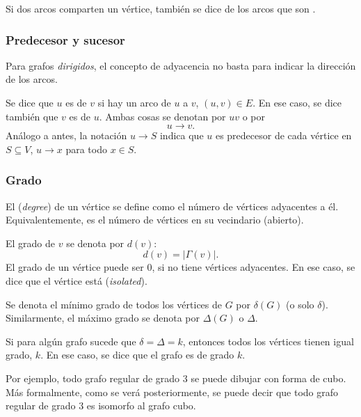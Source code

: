 Si dos arcos comparten un vértice, también se dice de los arcos que son .

\subsubsection{Predecesor y sucesor}
\label{sec:predecesor_sucesor}

Para grafos \emph{dirigidos}, el concepto de adyacencia no basta para indicar la dirección de los arcos.

Se dice que \(u\) es  de \(v\) si hay un arco de \(u\) a \(v\), \((u, v) \in E\). En ese caso, se dice también que \(v\) es  de \(u\). Ambas cosas se denotan por \(uv\) o por \[u \longrightarrow v.\]Análogo a antes, la notación \(u\longrightarrow S\) indica que \(u\) es predecesor de cada vértice en \(S\subseteq V\), \(u\longrightarrow x\) para todo \(x \in S\).

\subsubsection{Grado}
\label{sec:grado}

El  (\textit{degree}) de un vértice se define como el número de vértices adyacentes a él. Equivalentemente, es el número de vértices en su vecindario (abierto).

El grado de \(v\) se denota por \(d(v)\): \[d(v) = |\Gamma(v)|.\] El grado de un vértice puede ser 0, si no tiene vértices adyacentes. En ese caso, se dice que el vértice está  (\textit{isolated}).

Se denota el mínimo grado de todos los vértices de \(G\) por \(\delta(G)\) (o solo \(\delta\)). Similarmente, el máximo grado se denota por \(\Delta(G)\) o \(\Delta\).

Si para algún grafo sucede que \(\delta = \Delta = k\), entonces todos los vértices tienen igual grado, \(k\). En ese caso, se dice que el grafo es  de grado \(k\).

Por ejemplo, todo grafo regular de grado \(3\) se puede dibujar con forma de cubo. Más formalmente, como se verá posteriormente, se puede decir que todo grafo regular de grado \(3\) es isomorfo al grafo cubo.

